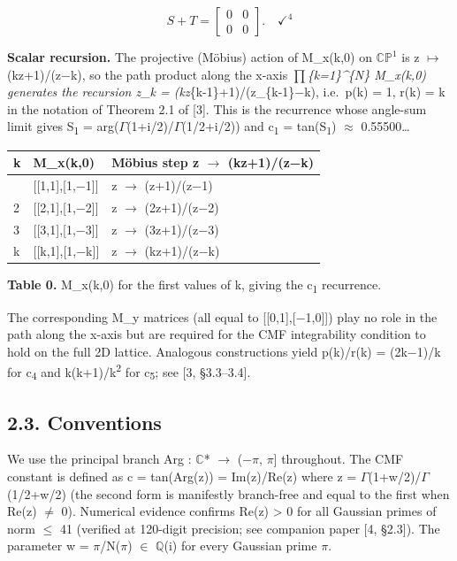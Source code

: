 \documentclass[11pt]{article}
\begin{document}
\[S + T = \begin{bmatrix}0&0\\0&0\end{bmatrix}. \quad \checkmark^4\]

\textbf{Scalar recursion.} The projective (Möbius) action of M\_x(k,0)
on \(\mathbb{C}\mathbb{P}^{1}\) is z \(\mapsto\) (kz+1)/(z−k), so the
path product along the x-axis \(\prod\)\emph{\{k=1\}\^{}\{N\} M\_x(k,0)
generates the recursion z\_k = (kz}\{k-1\}+1)/(z\_\{k-1\}−k), i.e.~p(k)
= 1, r(k) = k in the notation of Theorem 2.1 of {[}3{]}. This is the
recurrence whose angle-sum limit gives S\textsubscript{1} =
arg(\(\Gamma\)(1+i/2)/\(\Gamma\)(1/2+i/2)) and c\textsubscript{1} =
\textbar tan(S\textsubscript{1})\textbar{} \(\approx\) 0.55500\ldots{}

\begin{longtable}[]{@{}lll@{}}
\toprule\noalign{}
k & M\_x(k,0) & Möbius step z \(\to\) (kz+1)/(z−k) \\
\midrule\noalign{}
\endhead
\bottomrule\noalign{}
\endlastfoot
1 & {[}{[}1,1{]},{[}1,−1{]}{]} & z \(\to\) (z+1)/(z−1) \\
2 & {[}{[}2,1{]},{[}1,−2{]}{]} & z \(\to\) (2z+1)/(z−2) \\
3 & {[}{[}3,1{]},{[}1,−3{]}{]} & z \(\to\) (3z+1)/(z−3) \\
k & {[}{[}k,1{]},{[}1,−k{]}{]} & z \(\to\) (kz+1)/(z−k) \\
\end{longtable}

\textbf{Table 0.} M\_x(k,0) for the first values of k, giving the
c\textsubscript{1} recurrence.

The corresponding M\_y matrices (all equal to
{[}{[}0,1{]},{[}−1,0{]}{]}) play no role in the path along the x-axis
but are required for the CMF integrability condition to hold on the full
2D lattice. Analogous constructions yield p(k)/r(k) = (2k−1)/k for
c\textsubscript{4} and k(k+1)/k\textsuperscript{2} for
c\textsubscript{5}; see {[}3, §3.3--3.4{]}.

\hypertarget{conventions}{%
\subsection{2.3. Conventions}\label{conventions}}

We use the principal branch Arg : \(\mathbb{C}\)* \(\to\) (−\(\pi\),
\(\pi\){]} throughout. The CMF constant is defined as c =
\textbar tan(Arg(z))\textbar{} = \textbar Im(z)/Re(z)\textbar{} where z
= \(\Gamma\)(1+w/2)/\(\Gamma\)(1/2+w/2) (the second form is manifestly
branch-free and equal to the first when Re(z) \(\neq\) 0). Numerical
evidence confirms Re(z) \textgreater{} 0 for all Gaussian primes of norm
\(\leq\) 41 (verified at 120-digit precision; see companion paper {[}4,
§2.3{]}). The parameter w = \(\pi\)/N(\(\pi\)) \(\in\) \(\mathbb{Q}\)(i)
for every Gaussian prime \(\pi\).
\end{document}
